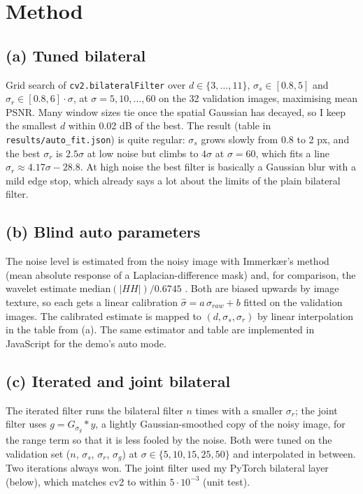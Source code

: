 \documentclass[11pt,a4paper]{article}
\begin{document}
\section{Method}

\subsection{(a) Tuned bilateral}

Grid search of \texttt{cv2.bilateralFilter} over $d\in\{3,\dots,11\}$, $\sigma_s\in[0.8,5]$ and
$\sigma_r\in[0.8,6]\cdot\sigma$, at $\sigma=5,10,\dots,60$ on the 32 validation images, maximising mean
PSNR. Many window sizes tie once the spatial Gaussian has decayed, so I keep the smallest $d$ within 0.02 dB
of the best. The result (table in \texttt{results/auto\_fit.json}) is quite regular: $\sigma_s$ grows
slowly from 0.8 to 2 px, and the best $\sigma_r$ is $2.5\sigma$ at low noise but climbs to $4\sigma$ at
$\sigma=60$, which fits a line $\sigma_r\approx 4.17\sigma-28.8$. At high noise the best filter is
basically a Gaussian blur with a mild edge stop, which already says a lot about the limits of the plain
bilateral filter.

\subsection{(b) Blind auto parameters}

The noise level is estimated from the noisy image with Immerk\ae r's method \cite{immerkaer96} (mean
absolute response of a Laplacian-difference mask) and, for comparison, the wavelet estimate
$\mathrm{median}(|HH|)/0.6745$ \cite{donoho94}. Both are biased upwards by image texture, so each gets a
linear calibration $\hat\sigma = a\,\sigma_{raw}+b$ fitted on the validation images. The calibrated
estimate is mapped to $(d,\sigma_s,\sigma_r)$ by linear interpolation in the table from (a). The same
estimator and table are implemented in JavaScript for the demo's auto mode.

\subsection{(c) Iterated and joint bilateral}

The iterated filter runs the bilateral filter $n$ times with a smaller $\sigma_r$; the joint filter uses
$g=G_{\sigma_g} * y$, a lightly Gaussian-smoothed copy of the noisy image, for the range term so that it
is less fooled by the noise. Both were tuned on the validation set ($n$, $\sigma_s$, $\sigma_r$, $\sigma_g$)
at $\sigma\in\{5,10,15,25,50\}$ and interpolated in between. Two iterations always won. The joint
filter used my PyTorch bilateral layer (below), which matches cv2 to within $5\cdot10^{-3}$ (unit test).
\end{document}
